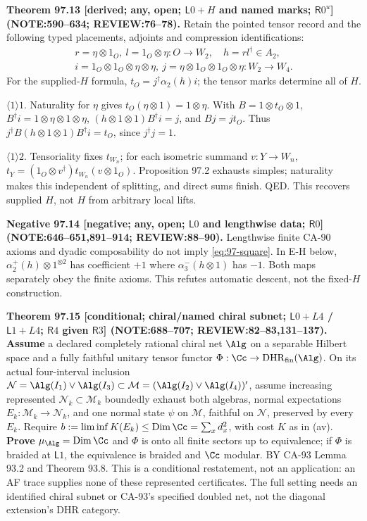 \textbf{Theorem 97.13 [derived; any, open; \(\mathsf L0+H\) and named marks; \(\mathsf R0^u\)] (NOTE:590--634; REVIEW:76--78).}
Retain the pointed tensor record and the following typed placements, adjoints and compression identifications:
\[\begin{gathered}
 r=\eta\otimes1_O,\ l=1_O\otimes\eta:O\to W_2,\quad h=rl^\dagger\in A_2,\\
 i=1_O\otimes1_O\otimes\eta\otimes\eta,\ j=\eta\otimes1_O\otimes1_O\otimes\eta:W_2\to W_4.
\end{gathered}\]
For the supplied-\(H\) formula, \(t_O=j^\dagger\alpha_2(h)i\); the tensor marks determine all of \(H\).
\par\(\langle1\rangle1\). Naturality for \(\eta\) gives \(t_O(\eta\otimes1)=1\otimes\eta\). With \(B=1\otimes t_O\otimes1\),
\(B^\dagger i=1\otimes\eta\otimes1\otimes\eta\), \((h\otimes1\otimes1)B^\dagger i=j\), and \(Bj=jt_O\).
Thus \(j^\dagger B(h\otimes1\otimes1)B^\dagger i=t_O\), since \(j^\dagger j=1\).
\par\(\langle1\rangle2\). Tensoriality fixes \(t_{W_n}\); for each isometric summand \(v:Y\to W_n\),
\(t_Y=(1_O\otimes v^\dagger)t_{W_n}(v\otimes1_O)\). Proposition 97.2 exhausts simples; naturality makes this
independent of splitting, and direct sums finish. QED. This recovers supplied \(H\), not \(H\) from arbitrary local lifts.

\textbf{Negative 97.14 [negative; any, open; \(\mathsf L0\) and lengthwise data; \(\mathsf R0\)] (NOTE:646--651,891--914; REVIEW:88--90).}
Lengthwise finite CA-90 axioms and dyadic composability do not imply \eqref{eq:97-square}. In E-H below,
\(\alpha_2^+(h)\otimes1^{\otimes2}\) has coefficient \(+1\) where \(\alpha_3^-(h\otimes1)\) has \(-1\).
Both maps separately obey the finite axioms. This refutes automatic descent, not the fixed-\(H\) construction.

\textbf{Theorem 97.15 [conditional; chiral/named chiral subnet; \(\mathsf L0+L4\) / \(\mathsf L1+L4\); \(\mathsf R4\) given \(\mathsf R3\)] (NOTE:688--707; REVIEW:82--83,131--137).}
\textbf{Assume} a declared completely rational chiral net \(\Alg\) on a separable Hilbert space and a fully faithful
unitary tensor functor \(\Phi:\Cc\to\mathrm{DHR}_{\mathrm{fin}}(\Alg)\). On its actual four-interval inclusion
\(\mathcal N=\Alg(I_1)\vee\Alg(I_3)\subset\mathcal M=(\Alg(I_2)\vee\Alg(I_4))'\), assume increasing represented
\(\mathcal N_k\subset\mathcal M_k\) boundedly exhaust both algebras, normal expectations \(E_k:\mathcal M_k\to\mathcal N_k\),
and one normal state \(\psi\) on \(\mathcal M\), faithful on \(\mathcal N\), preserved by every \(E_k\). Require
\(b:=\liminf K(E_k)\le\operatorname{Dim}\Cc=\sum_xd_x^2\), with cost \(K\) as in (av).
\textbf{Prove} \(\mu_\Alg=\operatorname{Dim}\Cc\) and \(\Phi\) is onto all finite sectors up to equivalence; if \(\Phi\) is
braided at \(\mathsf L1\), the equivalence is braided and \(\Cc\) modular. BY CA-93 Lemma 93.2 and Theorem 93.8.
This is a conditional restatement, not an application: an AF trace supplies none of these represented certificates.
The full setting needs an identified chiral subnet or CA-93's specified doubled net, not the diagonal extension's DHR category.

